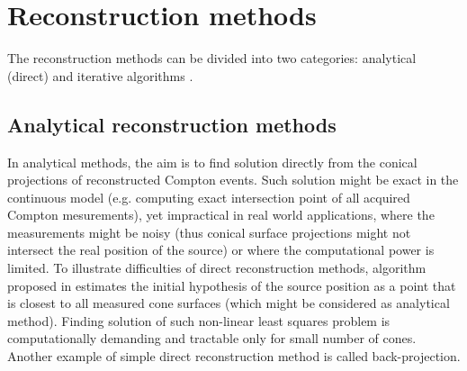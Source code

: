 \section{Reconstruction methods}
The reconstruction methods can be divided into two categories: analytical (direct) and iterative algorithms \cite{lojacono2}.
\subsection{Analytical reconstruction methods}
In analytical methods, the aim is to find solution directly from the conical projections of reconstructed Compton events.
Such solution might be exact in the continuous model (e.g. computing exact intersection point of all acquired Compton mesurements), yet impractical in real world applications, where the measurements might be noisy (thus conical surface projections might not intersect the real position of the source) or where the computational power is limited.
To illustrate difficulties of direct reconstruction methods, algorithm proposed in \cite{baca2021gamma} estimates the initial hypothesis of the source position as a point that is closest to all measured cone surfaces (which might be considered as analytical method).
Finding solution of such non-linear least squares problem is computationally demanding and tractable only for small number of cones.
Another example of simple direct reconstruction method is called back-projection.
